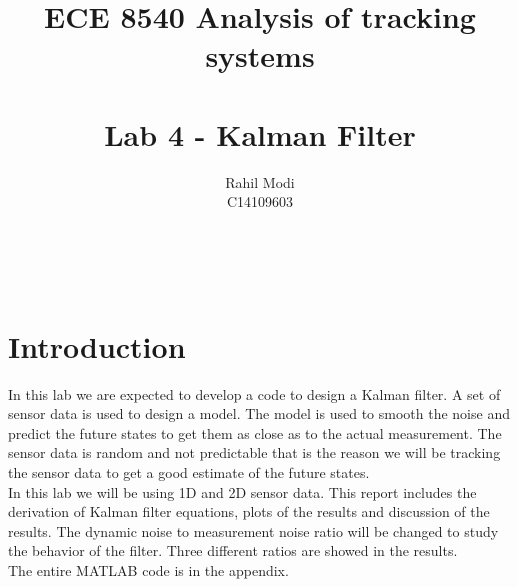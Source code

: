 \documentclass[12pt]{article}
\begin{document}

\title{\Huge{\bf ECE 8540 Analysis of tracking systems}\\ 
\\ 
\huge Lab 4 - Kalman Filter}\\
\author{\LARGE Rahil Modi\\
C14109603}
\maketitle
\clearpage
\section{Introduction}
In this lab we are expected to develop a code to design a Kalman filter. A set of sensor data is used to design a model. The model is used to smooth the noise and predict the future states to get them as close as to the actual measurement. The sensor data is random and not predictable that is the reason we will be tracking the sensor data to get a good estimate of the future states.\\In this lab we will be using 1D and 2D sensor data. This report includes the derivation of Kalman filter equations, plots of the results and discussion of the results. The dynamic noise to measurement noise ratio will be changed to study the behavior of the filter. Three different ratios are showed in the results.\\ The entire MATLAB code is in the appendix.
\end{document}

